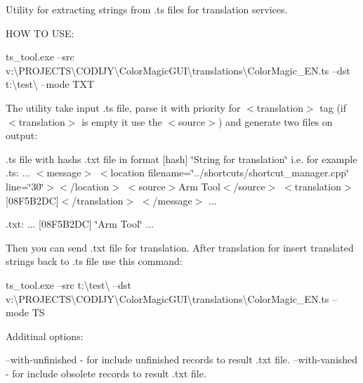 Utility for extracting strings from .ts files for translation services.

HOW TO USE\+:

ts\+\_\+tool.\+exe --src v\+:\textbackslash{}\+PROJECTS\textbackslash{}\+CODIJY\textbackslash{}\+Color\+Magic\+GUI\textbackslash{}translations\textbackslash{}\+Color\+Magic\+\_\+\+EN.ts --dst t\+:\textbackslash{}test\textbackslash{} --mode TXT

The utility take input .ts file, parse it with priority for $<$translation$>$ tag (if $<$translation$>$ is empty it use the $<$source$>$) and generate two files on output\+:

.ts file with hash\textquotesingle{}s .txt file in format \mbox{[}hash\mbox{]} \char`\"{}\+String for translation\char`\"{} i.\+e. for example .ts\+: ... $<$message$>$ $<$location filename=\char`\"{}../shortcuts/shortcut\+\_\+manager.\+cpp\char`\"{} line=\char`\"{}30\char`\"{}$>$$<$/location$>$ $<$source$>$Arm Tool$<$/source$>$ $<$translation$>$\mbox{[}08F5\+B2\+DC\mbox{]}$<$/translation$>$ $<$/message$>$ ...

.txt\+: ... \mbox{[}08F5\+B2\+DC\mbox{]} \char`\"{}\+Arm Tool\char`\"{} ...

Then you can send .txt file for translation. After translation for insert translated strings back to .ts file use this command\+:

ts\+\_\+tool.\+exe --src t\+:\textbackslash{}test\textbackslash{} --dst v\+:\textbackslash{}\+PROJECTS\textbackslash{}\+CODIJY\textbackslash{}\+Color\+Magic\+GUI\textbackslash{}translations\textbackslash{}\+Color\+Magic\+\_\+\+EN.ts --mode TS

Additinal options\+:

--with-\/unfinished -\/ for include unfinished records to result .txt file. --with-\/vanished -\/ for include obsolete records to result .txt file. 